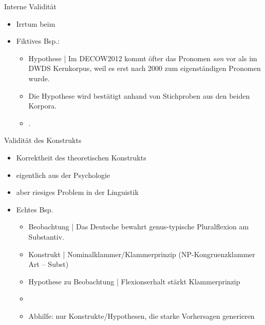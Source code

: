 \begin{frame}
  {Interne Validität}
  \begin{itemize}[<+->]
    \item Irrtum beim 
    \Zeile
    \item Fiktives Bsp.:
      \Viertelzeile
      \begin{itemize}[<+->]
	\item Hypothese | Im DECOW2012 kommt öfter das Pronomen \textit{son} vor als im\\
          DWDS Kernkorpus, weil es erst nach 2000 zum eigenständigen Pronomen wurde.
	\item Die Hypothese wird bestätigt anhand von Stichproben aus den beiden Korpora.
        \item {}.
      \end{itemize}
  \end{itemize}
\end{frame}

\begin{frame}
  {Validität des Konstrukts}
  \begin{itemize}[<+->]
    \item Korrektheit des \alert{theoretischen Konstrukts}
      \Zeile
    \item eigentlich aus der Psychologie
    \item aber riesiges Problem in der Linguistik
      \Zeile
    \item Echtes Bsp.
      \Viertelzeile
      \begin{itemize}
	\item Beobachtung | Das Deutsche bewahrt genus-typische Pluralflexion am Substantiv.
	\item Konstrukt | Nominalklammer\slash Klammerprinzip (NP-Kongruenzklammer Art -- Subst)\\
	\item Hypothese zu Beobachtung | Flexionserhalt stärkt Klammerprinzip
          \Halbzeile
	\item {}
         \Halbzeile 
	\item \alert{Abhilfe: nur Konstrukte\slash Hypothesen, die starke Vorhersagen generieren}
      \end{itemize}
  \end{itemize}
\end{frame}

